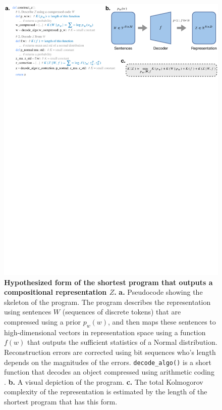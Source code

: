 \documentclass{article} %
\begin{document}
\begin{figure}[ht]
    \centering
    \includegraphics[width=\linewidth]{figures/program_form.pdf}
    \caption{\textbf{Hypothesized form of the shortest program that outputs a compositional representation $Z$.} \textbf{a.} Pseudocode showing the skeleton of the program. The program describes the representation using sentences $W$ (sequences of discrete tokens) that are compressed using a prior $p_w(w)$, and then maps these sentences to high-dimensional vectors in representation space using a function $f(w)$ that outputs the sufficient statistics of a Normal distribution. Reconstruction errors are corrected using bit sequences who's length depends on the magnitudes of the errors. \texttt{decode\_algo()} is a short function that decodes an object compressed using arithmetic coding \citep{witten1987arithmetic}. \textbf{b.} A visual depiction of the program. \textbf{c.} The total Kolmogorov complexity of the representation is estimated by the length of the shortest program that has this form.}
    \label{fig:program_form}
\end{figure}
\end{document}
